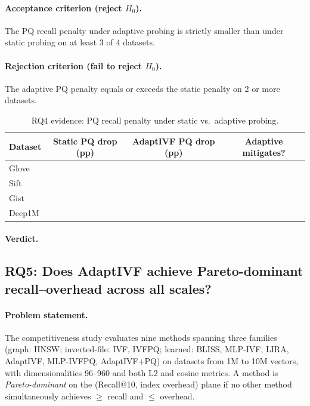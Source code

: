 \paragraph{Acceptance criterion (reject $H_0$).}
The PQ recall penalty under adaptive probing is strictly smaller than under
static probing on at least 3 of 4 datasets.

\paragraph{Rejection criterion (fail to reject $H_0$).}
The adaptive PQ penalty equals or exceeds the static penalty on 2 or more
datasets.

\begin{table}[h]
\centering
\caption{RQ4 evidence: PQ recall penalty under static vs.\ adaptive probing.}
\label{tab:appendix:rq4}
\begin{tabular}{lccc}
\toprule
Dataset & Static PQ drop (pp) & AdaptIVF PQ drop (pp) & Adaptive mitigates? \\
\midrule
Glove  & \placeholder{\_\_\_} & \placeholder{\_\_\_} & \placeholder{\_\_\_} \\
Sift   & \placeholder{\_\_\_} & \placeholder{\_\_\_} & \placeholder{\_\_\_} \\
Gist   & \placeholder{\_\_\_} & \placeholder{\_\_\_} & \placeholder{\_\_\_} \\
Deep1M & \placeholder{\_\_\_} & \placeholder{\_\_\_} & \placeholder{\_\_\_} \\
\bottomrule
\end{tabular}
\end{table}

\paragraph{Verdict.}

\subsection{RQ5: Does AdaptIVF achieve Pareto-dominant recall--overhead across all scales?}
\label{sec:appendix:rq5}

\paragraph{Problem statement.}
The competitiveness study evaluates nine methods spanning three families
(graph: HNSW; inverted-file: IVF, IVFPQ; learned: BLISS, MLP-IVF, LIRA,
AdaptIVF, MLP-IVFPQ, AdaptIVF+PQ) on datasets from 1M to 10M vectors, with
dimensionalities 96--960 and both L2 and cosine metrics.  A method is
\emph{Pareto-dominant} on the (Recall@10, index overhead) plane if no other
method simultaneously achieves $\geq$ recall and $\leq$ overhead.

